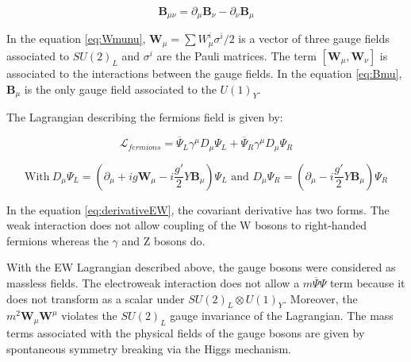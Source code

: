     \begin{equation}
        \textbf{B}_{\mu\nu}  =  \partial_{\mu}\textbf{B}_{\nu} - \partial_{\nu}\textbf{B}_{\mu}
        \label{eq:Bmu}
    \end{equation}
    
    In the equation \ref{eq:Wmunu}, $\textbf{W}_{\mu} = \sum W^i_{\mu}\sigma^i/2$ is a vector of three gauge fields associated to $SU(2)_L$ and $\sigma^i$ are the Pauli matrices. 
    The term $[\textbf{W}_{\mu},\textbf{W}_{\nu}]$ is associated to the interactions between the gauge fields.
    In the equation \ref{eq:Bmu}, $\textbf{B}_{\mu}$ is the only gauge field associated to the $U(1)_Y$.

    The Lagrangian describing the fermions field is given by:

    \begin{equation}
      \mathcal{L}_{fermions} = \overline{\Psi}_L\gamma^{\mu}D_{\mu}\Psi_L + \overline{\Psi}_R\gamma^{\mu}D_{\mu}\Psi_R
    \end{equation}
      
    \begin{equation}
      \text{With} \ D_{\mu}\Psi_L = \left( \partial_{\mu} + ig \textbf{W}_{\mu} - i \frac{g'}{2}Y\textbf{B}_{\mu}\right)\Psi_L \text{ and } D_{\mu}\Psi_R = \left(\partial_{\mu} - i\frac{g'}{2}Y\textbf{B}_{\mu}\right)\Psi_R
      \label{eq:derivativeEW}
    \end{equation}
    
    In the equation \ref{eq:derivativeEW}, the covariant derivative has two forms. 
    The weak interaction does not allow coupling of the W bosons to right-handed fermions whereas the $\gamma$ and Z bosons do.

    With the EW Lagrangian described above, the gauge bosons were considered as massless fields.
    The electroweak interaction does not allow a $m\overline{\Psi}\Psi$ term because it does not transform as a scalar under $SU(2)_L \otimes U(1)_Y$.
    Moreover, the $m^2 \textbf{W}_{\mu} \textbf{W}^{\mu}$ violates the $SU(2)_L$ gauge invariance of the Lagrangian.
    The mass terms associated with the physical fields of the gauge bosons are given by spontaneous symmetry breaking via the Higgs mechanism.




